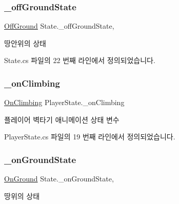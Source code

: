 \subsubsection{\texorpdfstring{\_offGroundState}{\_offGroundState}}
{\footnotesize\ttfamily \mbox{\hyperlink{class_state_a7d945e793324c017a973205564cf1a56}{Off\+Ground}} State.\+\_\+off\+Ground\+State\hspace{0.3cm}{\ttfamily [protected]}, {\ttfamily [inherited]}}



땅안위의 상태 



State.\+cs 파일의 22 번째 라인에서 정의되었습니다.

\mbox{\label{class_player_state_a779507cee79095e3bbd9e6e1f7f8b8a8}} 
\subsubsection{\texorpdfstring{\_onClimbing}{\_onClimbing}}
{\footnotesize\ttfamily \mbox{\hyperlink{class_player_state_a16e115e2b4c8d0420119d6ff2fe8b3bc}{On\+Climbing}} Player\+State.\+\_\+on\+Climbing\hspace{0.3cm}{\ttfamily [protected]}}



플레이어 벽타기 애니메이션 상태 변수 



Player\+State.\+cs 파일의 19 번째 라인에서 정의되었습니다.

\mbox{\label{class_state_ab3170df5e58f541f39edff3c1278d443}} 
\subsubsection{\texorpdfstring{\_onGroundState}{\_onGroundState}}
{\footnotesize\ttfamily \mbox{\hyperlink{class_state_ab9eb1c1d81f1903b8486d1275e78b68e}{On\+Ground}} State.\+\_\+on\+Ground\+State\hspace{0.3cm}{\ttfamily [protected]}, {\ttfamily [inherited]}}



땅위의 상태 



